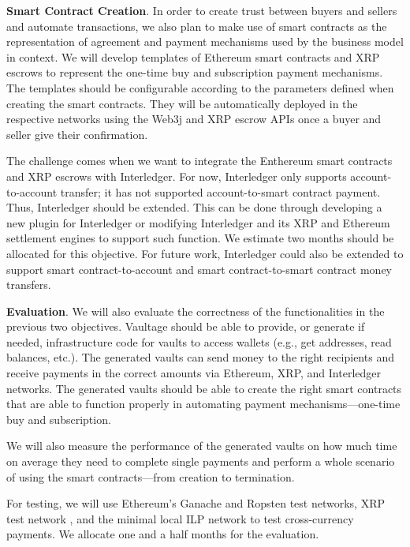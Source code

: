 \documentclass[]{article}
\begin{document}
	\textbf{Smart Contract Creation}. 
	In order to create trust between buyers and sellers and automate transactions, we also plan to make use of smart contracts as the representation of agreement and payment mechanisms used by the business model in context. We will develop templates of Ethereum smart contracts and XRP escrows to represent the one-time buy and subscription payment mechanisms. The templates should be configurable according to the parameters defined when creating the smart contracts.    
	They will be automatically deployed in the respective networks using the Web3j and XRP escrow APIs once a buyer and seller give their confirmation.
	
	The challenge comes when we want to integrate the Enthereum smart contracts and XRP escrows with Interledger. For now, Interledger only supports account-to-account transfer; it has not supported account-to-smart contract payment. 
	Thus, Interledger should be extended. 
	This can be done through developing a new plugin \cite{interledger-plugin} for Interledger or modifying Interledger \cite{interledger-rs} and its XRP and Ethereum settlement engines \cite{xrp-settlement,eth-settlement} to support such function. 
	We estimate two months should be allocated for this objective.
	For future work, Interledger could also be extended to support smart contract-to-account and  smart contract-to-smart contract money transfers. 
	
	\textbf{Evaluation}. 
	We will also evaluate the correctness of the functionalities in the previous two objectives. Vaultage should be able to provide, or generate if needed, infrastructure code for vaults to access wallets (e.g., get addresses, read balances, etc.). The generated vaults can send money to the right recipients and receive payments in the correct amounts via Ethereum, XRP, and Interledger networks. The generated vaults should be able to create the right smart contracts that are able to function properly in automating payment mechanisms---one-time buy and subscription.
	
	We will also measure the performance of the generated vaults on how much time on average they need to complete single payments and perform a whole scenario of using the smart contracts---from creation to termination. 
	
	For testing, we will use Ethereum's Ganache \cite{ganache} and Ropsten \cite{ropsten} test networks, XRP test network \cite{xrp-testnet}, and the minimal local ILP network \cite{ilp-testnet} to test cross-currency payments. We allocate one and a half months for the evaluation. 
	
\end{document}
